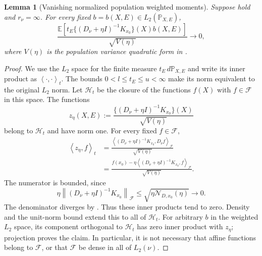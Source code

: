 \documentclass[11pt]{article}
\newtheorem{lemma}{Lemma}[section]
\newcommand{\E}{\mathbb{E}}
\newcommand{\F}{\mathcal{F}}
\newcommand{\Ncal}{\mathcal{N}}
\newcommand{\inner}[2]{\left\langle #1,#2\right\rangle}
\newcommand{\norm}[1]{\left\lVert #1\right\rVert}
\begin{document}
\begin{lemma}[Vanishing normalized population weighted moments]\label{lem:weak_representer}
Suppose  hold and $r_\nu=\infty$. For every fixed $b=b(X,E)\in L_2(\mathbb P_{X,E})$,
\[
 \frac{\E[t_E\{(D_\nu+\eta I)^{-1}K_{x_0}\}(X)b(X,E)]}{\sqrt{V(\eta)}}\longrightarrow0,
\]
where $V(\eta)$ is the population variance quadratic form in .
\end{lemma}
\begin{proof}
We use the $L_2$ space for the finite measure $t_E\,d\mathbb P_{X,E}$ and write its inner product as $\inner{\cdot}{\cdot}_t$. The bounds $0<l\leq t_E\leq u<\infty$ make its norm equivalent to the original $L_2$ norm. Let $\mathcal H_t$ be the closure of the functions $f(X)$ with $f\in\F$ in this space. The functions
\[
 z_\eta(X,E):=\frac{\{(D_\nu+\eta I)^{-1}K_{x_0}\}(X)}{\sqrt{V(\eta)}}
\]
belong to $\mathcal H_t$ and have norm one. For every fixed $f\in\F$,
\begin{align*}
 \inner{z_\eta}{f}_t
 &=\frac{\inner{(D_\nu+\eta I)^{-1}K_{x_0}}{D_\nu f}_{\F}}{\sqrt{V(\eta)}}\\
 &=\frac{f(x_0)-\eta\inner{(D_\nu+\eta I)^{-1}K_{x_0}}{f}_{\F}}{\sqrt{V(\eta)}}.
\end{align*}
The numerator is bounded, since
\[
 \eta\norm{(D_\nu+\eta I)^{-1}K_{x_0}}_{\F}
 \leq\sqrt{\eta\Ncal_{D,x_0}(\eta)}\longrightarrow0.
\]
The denominator diverges by . Thus these inner products tend to zero. Density and the unit-norm bound extend this to all of $\mathcal H_t$. For arbitrary $b$ in the weighted $L_2$ space, its component orthogonal to $\mathcal H_t$ has zero inner product with $z_\eta$; projection proves the claim. In particular, it is not necessary that affine functions belong to $\F$, or that $\F$ be dense in all of $L_2(\nu)$.
\end{proof}
\end{document}
